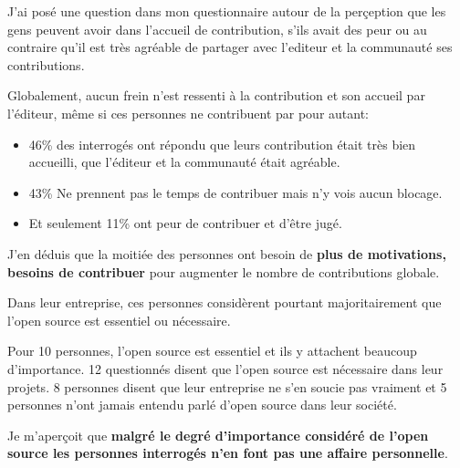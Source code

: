 			J'ai posé une question dans mon questionnaire autour de la perçeption que les gens peuvent avoir dans l'accueil de contribution, s'ils avait des peur ou au contraire qu'il est très agréable de partager avec l'editeur et la communauté ses contributions.

			Globalement, aucun frein n'est ressenti à la contribution et son accueil par l'éditeur, même si ces personnes ne contribuent par pour autant:

			\begin{itemize}[label=\textbullet, font=\LARGE \color{burntorange}]
				\item 46\% des interrogés ont répondu que leurs contribution était très bien accueilli, que l'éditeur et la communauté était agréable.
				\item 43\% Ne prennent pas le temps de contribuer mais n'y vois aucun blocage.
				\item Et seulement 11\% ont peur de contribuer et d'être jugé.
			\end{itemize}

			J'en déduis que la moitiée des personnes ont besoin de \textbf{plus de motivations, besoins de contribuer} pour augmenter le nombre de contributions globale.

			Dans leur entreprise, ces personnes considèrent pourtant majoritairement que l'open source est essentiel ou nécessaire.

			Pour 10 personnes, l'open source est essentiel et ils y attachent beaucoup d'importance.
			12 questionnés disent que l'open source est nécessaire dans leur projets. 8 personnes disent que leur entreprise ne s'en soucie pas vraiment et 5 personnes n'ont jamais entendu parlé d'open source dans leur société.

			Je m'aperçoit que \textbf{malgré le degré d'importance considéré de l'open source les personnes interrogés n'en font pas une affaire personnelle}.

